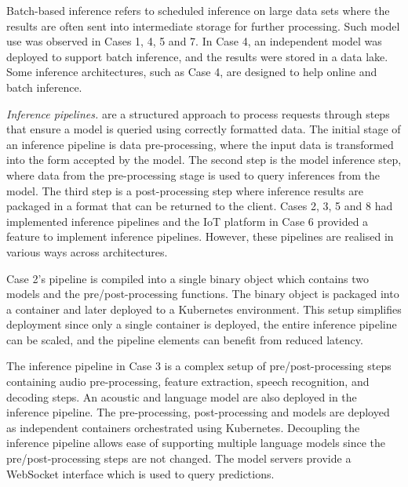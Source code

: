 Batch-based inference refers to scheduled inference on large data sets where the results are often sent into intermediate storage for further processing. Such model use was observed in Cases 1, 4, 5 and 7. In Case 4, an independent model was deployed to support batch inference, and the results were stored in a data lake. Some inference architectures, such as Case 4, are designed to help online and batch inference.

\textit{Inference pipelines.} are a structured approach to process requests through steps that ensure a model is queried using correctly formatted data. The initial stage of an inference pipeline is data pre-processing, where the input data is transformed into the form accepted by the model. The second step is the model inference step, where data from the pre-processing stage is used to query inferences from the model. The third step is a post-processing step where inference results are packaged in a format that can be returned to the client. Cases 2, 3, 5 and 8 had implemented inference pipelines and the IoT platform in Case 6 provided a feature to implement inference pipelines. However, these pipelines are realised in various ways across architectures.

Case 2's pipeline is compiled into a single binary object which contains two models and the pre/post-processing functions. The binary object is packaged into a container and later deployed to a Kubernetes environment. This setup simplifies deployment since only a single container is deployed, the entire inference pipeline can be scaled, and the pipeline elements can benefit from reduced latency.

The inference pipeline in Case 3 is a complex setup of pre/post-processing steps containing audio pre-processing, feature extraction, speech recognition, and decoding steps. An acoustic and language model are also deployed in the inference pipeline. The pre-processing, post-processing and models are deployed as independent containers orchestrated using Kubernetes. Decoupling the inference pipeline allows ease of supporting multiple language models since the pre/post-processing steps are not changed. The model servers provide a WebSocket interface which is used to query predictions. %

